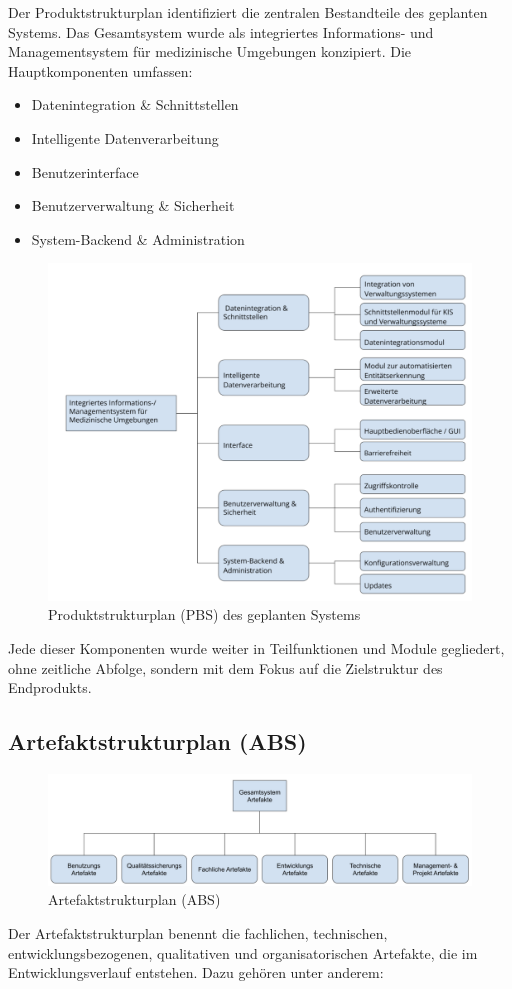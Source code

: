 Der Produktstrukturplan identifiziert die zentralen Bestandteile des geplanten Systems. Das Gesamtsystem wurde als integriertes Informations- und Managementsystem für medizinische Umgebungen konzipiert. Die Hauptkomponenten umfassen:
\begin{itemize}
	\item Datenintegration \& Schnittstellen
	\item Intelligente Datenverarbeitung
	\item Benutzerinterface
	\item Benutzerverwaltung \& Sicherheit
	\item System-Backend \& Administration
\end{itemize}
\begin{figure}[ht]
	\centering
	\includegraphics[width=1\textwidth]{fig/planung_alle_ebenen.png}
	\caption{Produktstrukturplan (PBS) des geplanten Systems}
	\label{fig:produktstrukturplan}
\end{figure}

Jede dieser Komponenten wurde weiter in Teilfunktionen und Module gegliedert, ohne zeitliche Abfolge, sondern mit dem Fokus auf die Zielstruktur des Endprodukts.

\subsection{Artefaktstrukturplan (ABS)}
\begin{figure}[ht]
	\centering
	\includegraphics[width=1\textwidth]{fig/abs.png}
	\caption{Artefaktstrukturplan (ABS)}
	\label{fig:artefaktstrukturplan}
\end{figure}
Der Artefaktstrukturplan benennt die fachlichen, technischen, entwicklungsbezogenen, qualitativen und organisatorischen Artefakte, die im Entwicklungsverlauf entstehen. Dazu gehören unter anderem:


